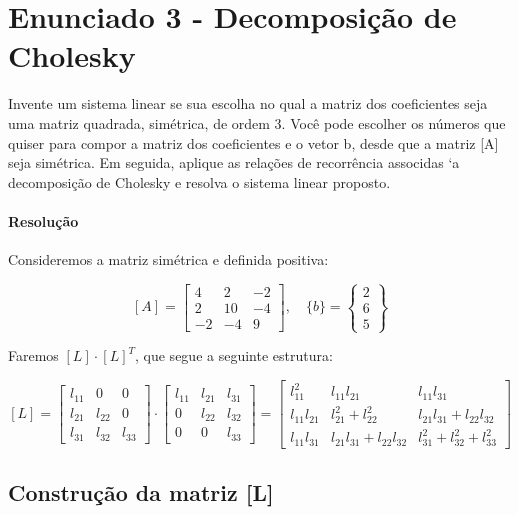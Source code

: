 \documentclass[12pt]{article}
\begin{document}
\section{Enunciado 3 - Decomposição de Cholesky}
Invente um sistema linear se sua escolha no qual a matriz dos coeficientes seja uma matriz
quadrada, simétrica, de ordem 3. Você pode escolher os números que quiser para compor
a matriz dos coeficientes e o vetor {b}, desde que a matriz [A] seja simétrica. Em seguida,
aplique as relações de recorrência associdas `a decomposição de Cholesky e resolva o sistema
linear proposto.

\paragraph{Resolução} Consideremos a matriz simétrica e definida positiva:

\[
[A] = \begin{bmatrix}
4 & 2 & -2 \\
2 & 10 & -4 \\
-2 & -4 & 9
\end{bmatrix}, \quad
\{b\} = \begin{Bmatrix}
  2 \\
  6 \\
  5
\end{Bmatrix}
\]

Faremos \([L]\cdot[L]^{T}\), que segue a seguinte estrutura:

\[
[L] = \begin{bmatrix}
l_{11} & 0 & 0 \\
l_{21} & l_{22} & 0 \\
l_{31} & l_{32} & l_{33}
\end{bmatrix} \cdot
\begin{bmatrix}
l_{11} & l_{21} & l_{31} \\
0 & l_{22} & l_{32} \\
0 & 0 & l_{33}
\end{bmatrix} =
\begin{bmatrix}
  l_{11}^2 & l_{11}l_{21} & l_{11}l_{31} \\
  l_{11}l_{21} & l_{21}^2 + l_{22}^2 & l_{21}l_{31} + l_{22}l_{32} \\
  l_{11}l_{31} & l_{21}l_{31} + l_{22}l_{32} & l_{31}^2 + l_{32}^2 + l_{33}^2
\end{bmatrix}
\]

\subsection{Construção da matriz [L]}
\end{document}
